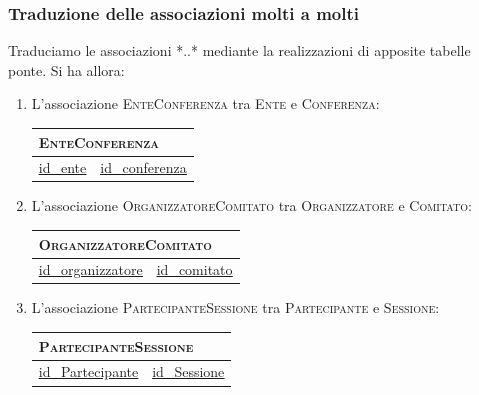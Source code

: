 \subsubsection{Traduzione delle associazioni molti a molti}
Traduciamo le associazioni *..* mediante la realizzazioni di apposite tabelle ponte. Si ha allora:
\begin{enumerate}
	\item L'associazione \textsc{EnteConferenza} tra \textsc{Ente} e \textsc{Conferenza}:

		\begin{tabular}{|l|l|}
			\multicolumn{2}{l}{\textsc{EnteConferenza}} \\ \hline
			\underline{\underline{id\_ente}} & \underline{\underline{id\_conferenza}} \\ \hline
		\end{tabular}

\item L'associazione \textsc{OrganizzatoreComitato} tra \textsc{Organizzatore} e \textsc{Comitato}:

	\begin{tabular}{|l|l|}
		\multicolumn{2}{l}{\textsc{OrganizzatoreComitato}} \\ \hline
		\underline{\underline{id\_organizzatore}} & \underline{\underline{id\_comitato}} \\ \hline
	\end{tabular}

\item L'associazione \textsc{PartecipanteSessione} tra \textsc{Partecipante} e \textsc{Sessione}:

	\begin{tabular}{|l|l|}
		\multicolumn{2}{l}{\textsc{PartecipanteSessione}} \\ \hline
		\underline{\underline{id\_Partecipante}} & \underline{\underline{id\_Sessione}} \\ \hline
	\end{tabular}

\end{enumerate}
